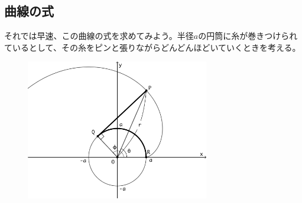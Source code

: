 \subsection{曲線の式}
それでは早速、この曲線の式を求めてみよう。半径$a$の円筒に糸が巻きつけられているとして、その糸をピンと張りながらどんどんほどいていくときを考える。

\begin{figure}[H]
  \centering
  \includegraphics[width=8cm]{nakayama1/image/imbo1}
\end{figure}

